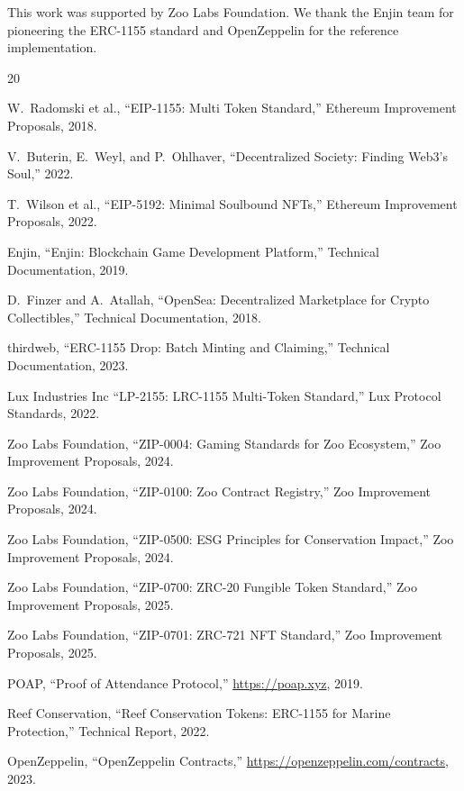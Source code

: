 \documentclass[11pt,letterpaper]{article}
\begin{document}
This work was supported by Zoo Labs Foundation. We thank the Enjin team for pioneering the ERC-1155 standard and OpenZeppelin for the reference implementation.


\begin{thebibliography}{20}

W.~Radomski et al., ``EIP-1155: Multi Token Standard,'' Ethereum Improvement Proposals, 2018.

V.~Buterin, E.~Weyl, and P.~Ohlhaver, ``Decentralized Society: Finding Web3's Soul,'' 2022.

T.~Wilson et al., ``EIP-5192: Minimal Soulbound NFTs,'' Ethereum Improvement Proposals, 2022.

Enjin, ``Enjin: Blockchain Game Development Platform,'' Technical Documentation, 2019.

D.~Finzer and A.~Atallah, ``OpenSea: Decentralized Marketplace for Crypto Collectibles,'' Technical Documentation, 2018.

thirdweb, ``ERC-1155 Drop: Batch Minting and Claiming,'' Technical Documentation, 2023.

Lux Industries Inc ``LP-2155: LRC-1155 Multi-Token Standard,'' Lux Protocol Standards, 2022.

Zoo Labs Foundation, ``ZIP-0004: Gaming Standards for Zoo Ecosystem,'' Zoo Improvement Proposals, 2024.

Zoo Labs Foundation, ``ZIP-0100: Zoo Contract Registry,'' Zoo Improvement Proposals, 2024.

Zoo Labs Foundation, ``ZIP-0500: ESG Principles for Conservation Impact,'' Zoo Improvement Proposals, 2024.

Zoo Labs Foundation, ``ZIP-0700: ZRC-20 Fungible Token Standard,'' Zoo Improvement Proposals, 2025.

Zoo Labs Foundation, ``ZIP-0701: ZRC-721 NFT Standard,'' Zoo Improvement Proposals, 2025.

POAP, ``Proof of Attendance Protocol,'' \url{https://poap.xyz}, 2019.

Reef Conservation, ``Reef Conservation Tokens: ERC-1155 for Marine Protection,'' Technical Report, 2022.

OpenZeppelin, ``OpenZeppelin Contracts,'' \url{https://openzeppelin.com/contracts}, 2023.


\end{thebibliography}
\end{document}
